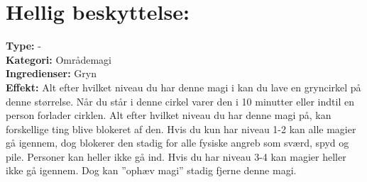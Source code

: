 \section{Hellig beskyttelse:}
\textbf{Type:} -\\
\textbf{Kategori:} Områdemagi\\
\textbf{Ingredienser:} Gryn\\
\textbf{Effekt:} Alt efter hvilket niveau du har denne magi i kan du lave en gryncirkel på denne størrelse. Når du står i denne cirkel varer den i 10 minutter eller indtil en person forlader cirklen. Alt efter hvilket niveau du har denne magi på, kan forskellige ting blive blokeret af den. Hvis du kun har niveau 1-2 kan alle magier gå igennem, dog blokerer den stadig for alle fysiske angreb som sværd, spyd og pile. Personer kan heller ikke gå ind. Hvis du har niveau 3-4 kan magier heller ikke gå igennem. Dog kan ”ophæv magi” stadig fjerne denne magi.

